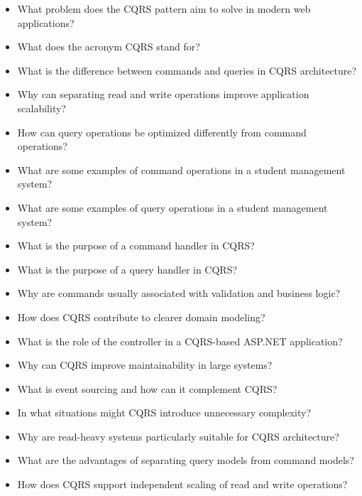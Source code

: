 \begin{itemize}
    \item What problem does the CQRS pattern aim to solve in modern web applications?
    
    \item What does the acronym CQRS stand for?
    
    \item What is the difference between commands and queries in CQRS architecture?
    
    \item Why can separating read and write operations improve application scalability?
    
    \item How can query operations be optimized differently from command operations?
    
    \item What are some examples of command operations in a student management system?
    
    \item What are some examples of query operations in a student management system?
    
    \item What is the purpose of a command handler in CQRS?
    
    \item What is the purpose of a query handler in CQRS?
    
    \item Why are commands usually associated with validation and business logic?
    
    \item How does CQRS contribute to clearer domain modeling?
    
    \item What is the role of the controller in a CQRS-based ASP.NET application?
    
    \item Why can CQRS improve maintainability in large systems?
    
    \item What is event sourcing and how can it complement CQRS?
    
    \item In what situations might CQRS introduce unnecessary complexity?
    
    \item Why are read-heavy systems particularly suitable for CQRS architecture?
    
    \item What are the advantages of separating query models from command models?
    
    \item How does CQRS support independent scaling of read and write operations?
\end{itemize}